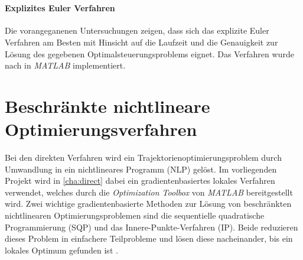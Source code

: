 \begin{figure}[htbp]
    \centering 
    \qquad
     \\

    \qquad
\end{figure}


\paragraph{Explizites Euler Verfahren}
Die vorangeganenen Untersuchungen zeigen, dass sich das explizite Euler Verfahren am Besten mit Hinsicht auf die Laufzeit und die Genauigkeit zur Lösung des gegebenen Optimalsteuerungsproblems eignet. Das Verfahren wurde nach \cite{Brokate2016} in \textit{MATLAB} implementiert.










\section{Beschränkte nichtlineare Optimierungsverfahren}\label{kap:OptVerfahren}
Bei den direkten Verfahren wird ein Trajektorienoptimierungsproblem durch Umwandlung in ein nichtlineares Programm (NLP) gelöst. Im vorliegenden Projekt wird in \autoref{cha:direct} dabei ein gradientenbasiertes lokales Verfahren verwendet, welches durch die \textit{Optimization Toolbox} von \textit{MATLAB} bereitgestellt wird. Zwei wichtige gradientenbasierte Methoden zur Lösung von beschränkten nichtlinearen Optimierungsproblemen sind die sequentielle quadratische Programmierung (SQP) und das Innere-Punkte-Verfahren (IP). Beide reduzieren dieses Problem in einfachere Teilprobleme und lösen diese nacheinander, bis ein lokales Optimum gefunden ist \cite{Betts2010}.

